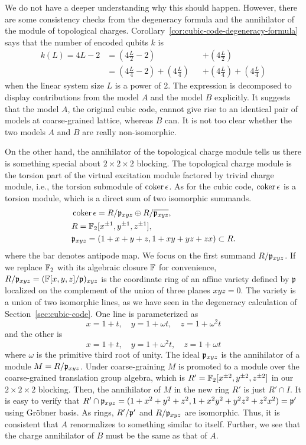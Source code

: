 We do not have a deeper understanding why this should happen.
However, there are some consistency checks
from the degeneracy formula and the annihilator of the module of topological charges.
Corollary~\ref{cor:cubic-code-degeneracy-formula} says that
the number of encoded qubits $k$ is
\begin{align*}
k(L) = 4L -2 
&= \left( 4 \frac{L}{2} - 2\right) & &+ \left( 4 \frac{L}{2} \right) \\
&= \left( 4 \frac{L}{4} - 2\right) + \left( 4 \frac{L}{4} \right) & &+ \left( 4 \frac{L}{4} \right) + \left( 4 \frac{L}{4} \right)
\end{align*}
when the linear system size $L$ is a power of 2.
The expression is decomposed to display contributions from the model $A$ and the model $B$ explicitly.
It suggests that the model $A$, the original cubic code, 
cannot give rise to an identical pair of models at coarse-grained lattice,
whereas $B$ can.
It is not too clear whether the two models $A$ and $B$ are really non-isomorphic.

On the other hand, the annihilator of the topological charge module 
tells us there is something special about $2 \times 2 \times 2$ blocking.
The topological charge module is the torsion part of the virtual excitation module factored by trivial charge module,
i.e., the torsion submodule of $\mathop{\mathrm{coker}}\nolimits \epsilon$.
As for the cubic code, $\mathop{\mathrm{coker}}\nolimits \epsilon$ is a torsion module, which is a direct sum of two isomorphic summands.
\begin{align*}
& \mathop{\mathrm{coker}}\nolimits \epsilon = R/\mathfrak{p}_{xyz} \oplus R / \overline{ \mathfrak{p}_{xyz} } , \\
& R = \mathbb{F}_2[x^{\pm 1},y^{\pm 1},z^{\pm 1}],\\
& \mathfrak{p}_{xyz} = (1+x+y+z,1+xy+yz+zx) \subset R.\\
\end{align*}
where the bar denotes antipode map.
We focus on the first summand $R/\mathfrak{p}_{xyz}$.
If we replace $\mathbb{F}_2$ with its algebraic closure $\mathbb{F}$ for convenience,
$R/\mathfrak{p}_{xyz} = (\mathbb{F}[x,y,z]/\mathfrak{p})_{xyz}$ is the coordinate ring of an affine variety defined by $\mathfrak{p}$
localized on the complement of the union of three planes $xyz=0$.
The variety is a union of two isomorphic lines, 
as we have seen in the degeneracy calculation of Section~\ref{sec:cubic-code}.
One line is parameterized as
\[
x = 1+ t, \quad y = 1+ \omega t, \quad z = 1 + \omega^2 t
\]
and the other is
\[
x = 1+t, \quad y = 1+ \omega^2 t, \quad z = 1+ \omega t
\]
where $\omega$ is the primitive third root of unity.
The ideal $\mathfrak{p}_{xyz}$ is the annihilator of a module $M = R/\mathfrak{p}_{xyz}$.
Under coarse-graining $M$ is promoted to a module over the coarse-grained
translation group algebra, which is $R ' = \mathbb{F}_2[x^{\pm 2}, y^{\pm 2}, z^{\pm 2}]$
in our $2 \times 2 \times 2$ blocking.
Then, the annihilator of $M$ in the new ring $R'$ is just $R' \cap I$.
It is easy to verify that $R' \cap \mathfrak{p}_{xyz} = (1+x^2 + y^2 + z^2, 1+ x^2 y^2 + y^2 z^2 + z^2 x^2 ) = \mathfrak{p}'$
using Gr\"obner basis.
As rings, $R'/\mathfrak{p}'$ and $R/\mathfrak{p}_{xyz}$ are isomorphic.
Thus, it is consistent that $A$ renormalizes to something similar to itself.
Further, we see that the charge annihilator of $B$ must be the same as that of $A$.

